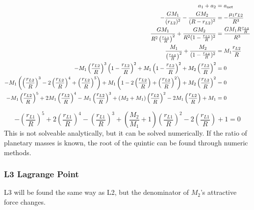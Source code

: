 \documentclass[../basicOrbitalDynamics.tex]{subfiles}
\begin{document}
\begin{align*}
    a_1+a_2   & ={a}_\text{net}\\
    -\frac{GM_1}{(r_{L2})^2}-\frac{GM_2}{(R-r_{L2})^2}& = -\frac{\mu_1 r_{L2}}{R^3}\\
    \frac{GM_1}{R^2\left(\frac{r_{L2}}{R}\right)^2}+\frac{GM_2}{R^2(1-\frac{r_{L2}}{R})^2}    & = \frac{GM_1 R\frac{r_{L2}}{R}}{R^3} \\
    \frac{M_1}{\left(\frac{r_{L2}}{R}\right)^2}+\frac{M_2}{(1-\frac{r_{L2}}{R})^2}  & = M_1\frac{r_{L2}}{R} \\
    -M_1\left(\frac{r_{L2}}{R}\right)^3\left(1-\frac{r_{L2}}{R}\right)^2+M_1\left(1-\frac{r_{L2}}{R}\right)^2+M_2\left(\frac{r_{L2}}{R}\right)^2& = 0    \\
    -M_1\left(\left(\frac{r_{L2}}{R}\right)^3-2\left(\frac{r_{L2}}{R}\right)^4+\left(\frac{r_{L2}}{R}\right)^5\right)+M_1\left(1-2\left(\frac{r_{L2}}{R}\right)+\left(\frac{r_{L2}}{R}\right)^2\right)+M_2\left(\frac{r_{L2}}{R}\right)^2 & = 0    \\
    -M_1\left(\frac{r_{L2}}{R}\right)^5+2M_1\left(\frac{r_{L2}}{R}\right)^4-M_1\left(\frac{r_{L2}}{R}\right)^3+(M_2+M_1)\left(\frac{r_{L2}}{R}\right)^2-2M_1\left(\frac{r_{L2}}{R}\right)+M_1& = 0    \\
\end{align*}

\begin{equation}\label{L2 Equation}
    -\left(\frac{r_{L1}}{R}\right)^5+2\left(\frac{r_{L1}}{R}\right)^4-\left(\frac{r_{L1}}{R}\right)^3+\left(\frac{M_2}{M_1}+1\right)\left(\frac{r_{L1}}{R}\right)^2-2\left(\frac{r_{L1}}{R}\right)+1= 0
\end{equation}
This is not solveable analytically, but it can be solved numerically. If the ratio of planetary masses is known, the root of the quintic can be found through numeric methods.

\subsubsection{L3 Lagrange Point}

L3 will be found the same way as L2, but the denominator of $M_2$'s attractive force changes.
\end{document}
